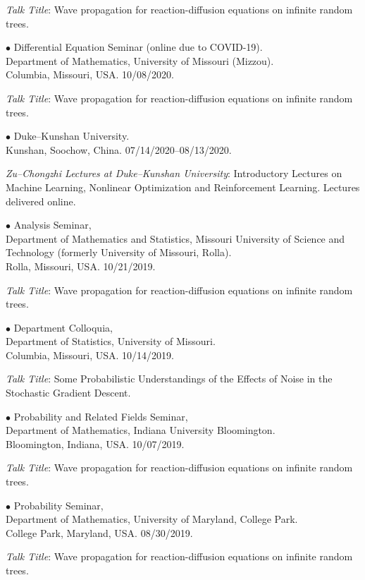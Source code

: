 \documentclass[margin,line]{res}
\begin{document}
\begin{resume}
\textit{Talk Title}: Wave propagation for reaction-diffusion equations on infinite random trees.


{$\bullet$ Differential Equation Seminar (online due to COVID-19). \\ Department of Mathematics,
University of Missouri (Mizzou). \\
Columbia, Missouri, USA.} \hfill 10/08/2020.

\textit{Talk Title}: Wave propagation for reaction-diffusion equations on infinite random trees.

{$\bullet$ Duke--Kunshan University. \\
Kunshan, Soochow, China.} \hfill 07/14/2020--08/13/2020.

\textit{Zu--Chongzhi Lectures at Duke--Kunshan University}: Introductory Lectures on Machine Learning, Nonlinear Optimization and Reinforcement Learning. Lectures delivered online. 

{$\bullet$ Analysis Seminar,
\\
Department of Mathematics and Statistics, Missouri University of Science and Technology (formerly University of Missouri, Rolla). \\
Rolla, Missouri, USA.} \hfill 10/21/2019.

\textit{Talk Title}: Wave propagation for reaction-diffusion equations on infinite random trees.

{$\bullet$ Department Colloquia,
\\
Department of Statistics, University of Missouri. \\
Columbia, Missouri, USA.} \hfill 10/14/2019.

\textit{Talk Title}: Some Probabilistic Understandings of the Effects of Noise in the Stochastic Gradient Descent.

{$\bullet$ Probability and Related Fields Seminar,
\\
Department of Mathematics, Indiana University Bloomington. \\
Bloomington, Indiana, USA.} \hfill 10/07/2019.

\textit{Talk Title}: Wave propagation for reaction-diffusion equations on infinite random trees.

{$\bullet$ Probability Seminar,
\\
Department of Mathematics, University of Maryland, College Park. \\
College Park, Maryland, USA.} \hfill 08/30/2019.

\textit{Talk Title}: Wave propagation for reaction-diffusion equations on infinite random trees.


\end{resume}
\end{document}
